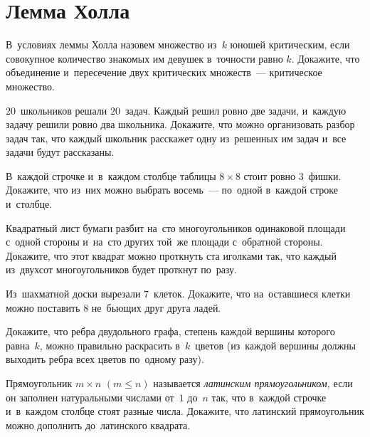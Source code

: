 
\section*{Лемма Холла}


\begin{problems}

\item
В~условиях леммы Холла назовем множество из~$k$ юношей критическим, если
совокупное количество знакомых им девушек в~точности равно $k$.
Докажите, что объединение и~пересечение двух критических множеств~---
критическое множество.

\item
$20$~школьников решали $20$~задач.
Каждый решил ровно две задачи, и~каждую задачу решили ровно два школьника.
Докажите, что можно организовать разбор задач так, что каждый школьник
расскажет одну из~решенных им задач и~все задачи будут рассказаны.

\item
В~каждой строчке и~в~каждом столбце таблицы $8 \times 8$ стоит ровно $3$~фишки.
Докажите, что из~них можно выбрать восемь~--- по~одной в~каждой строке
и~столбце.

\item
Квадратный лист бумаги разбит на~сто многоугольников одинаковой площади с~одной
стороны и~на~сто других той~же площади с~обратной стороны.
Докажите, что этот квадрат можно проткнуть ста иголками так, что каждый
из~двухсот многоугольников будет проткнут по~разу.

\item
Из~шахматной доски вырезали $7$~клеток.
Докажите, что на~оставшиеся клетки можно поставить $8$ не~бьющих друг друга
ладей.

\item
Докажите, что ребра двудольного графа, степень каждой вершины которого
равна~$k$, можно правильно раскрасить в~$k$~цветов
(из~каждой вершины должны выходить ребра всех цветов по~одному разу).

\item
Прямоугольник $m \times n$ $(m \leq n)$ называется
\emph{латинским прямоугольником,} если он заполнен натуральными числами от~$1$
до~$n$ так, что в~каждой строчке и~в~каждом столбце стоят разные числа.
Докажите, что латинский прямоугольник можно дополнить до~латинского квадрата.


\end{problems}
